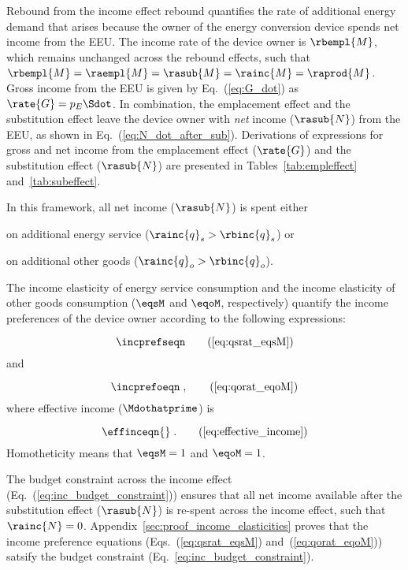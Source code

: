 Rebound from the income effect rebound quantifies the rate of additional energy demand 
that arises because the owner of the energy conversion device spends net
income from the EEU.
The income rate of the device owner is $\rbempl{M}$, 
which remains unchanged across the rebound effects, 
such that
$\rbempl{M} = \raempl{M} = \rasub{M} = \rainc{M} = \raprod{M}$.
Gross income from the EEU is given by Eq.~(\ref{eq:G_dot})
as $\rate{G} = p_E \Sdot$. 
In combination, the emplacement effect and
the substitution effect leave the device owner with
\emph{net} income ($\rasub{N}$) from the EEU,
as shown in Eq.~(\ref{eq:N_dot_after_sub}).
Derivations of expressions for gross and net income from the 
emplacement effect ($\rate{G}$) and
the substitution effect ($\rasub{N}$)
are presented in Tables~\ref{tab:empleffect} and~\ref{tab:subeffect}.

In this framework, all net income ($\rasub{N}$) is spent either 
%
\begin{enumerate*}[label={(\alph*)}]
	
  \item on additional energy service ($\rainc{q}_s > \rbinc{q}_s$) or
  
  \item on additional other goods ($\rainc{q}_o > \rbinc{q}_o$).
    
\end{enumerate*}
%
The income elasticity of energy service consumption and 
the income elasticity of other goods consumption 
($\eqsM$ and $\eqoM$, respectively)
quantify the income preferences of the device owner according to the following expressions:

\begin{equation}
  \incprefseqn \tag{\ref{eq:qsrat_eqsM}}
\end{equation}
%
and

\begin{equation}
  \incprefoeqn \; , \tag{\ref{eq:qorat_eqoM}}
\end{equation}
%
where effective income ($\Mdothatprime$) is

\begin{equation}
  \effinceqn{} \; . \tag{\ref{eq:effective_income}}
\end{equation}
%
Homotheticity means that $\eqsM = 1$ and $\eqoM = 1$.

The budget constraint across the income effect (Eq.~(\ref{eq:inc_budget_constraint})) 
ensures that all net income available after the substitution effect ($\rasub{N}$) 
is re-spent across the income effect, 
such that $\rainc{N} = 0$.
Appendix~\ref{sec:proof_income_elasticities} proves that
the income preference equations (Eqs.~(\ref{eq:qsrat_eqsM}) and~(\ref{eq:qorat_eqoM})) 
satsify the budget constraint (Eq.~\ref{eq:inc_budget_constraint}).

